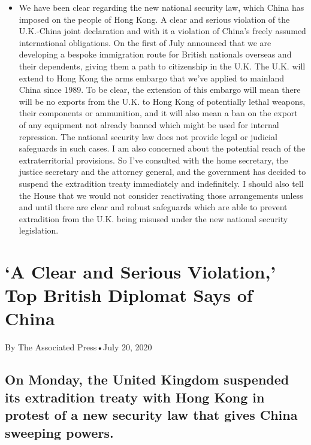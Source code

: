 \begin{itemize}
\tightlist
\item
  We have been clear regarding the new national security law, which
  China has imposed on the people of Hong Kong. A clear and serious
  violation of the U.K.-China joint declaration and with it a violation
  of China's freely assumed international obligations. On the first of
  July announced that we are developing a bespoke immigration route for
  British nationals overseas and their dependents, giving them a path to
  citizenship in the U.K. The U.K. will extend to Hong Kong the arms
  embargo that we've applied to mainland China since 1989. To be clear,
  the extension of this embargo will mean there will be no exports from
  the U.K. to Hong Kong of potentially lethal weapons, their components
  or ammunition, and it will also mean a ban on the export of any
  equipment not already banned which might be used for internal
  repression. The national security law does not provide legal or
  judicial safeguards in such cases. I am also concerned about the
  potential reach of the extraterritorial provisions. So I've consulted
  with the home secretary, the justice secretary and the attorney
  general, and the government has decided to suspend the extradition
  treaty immediately and indefinitely. I should also tell the House that
  we would not consider reactivating those arrangements unless and until
  there are clear and robust safeguards which are able to prevent
  extradition from the U.K. being misused under the new national
  security legislation.
\end{itemize}

\hypertarget{a-clear-and-serious-violation-top-british-diplomat-says-of-china-1}{%
\section{`A Clear and Serious Violation,' Top British Diplomat Says of
China}\label{a-clear-and-serious-violation-top-british-diplomat-says-of-china-1}}

By The Associated Press•July 20, 2020

\hypertarget{on-monday-the-united-kingdom-suspended-its-extradition-treaty-with-hong-kong-in-protest-of-a-new-security-law-that-gives-china-sweeping-powers-1}{%
\subsection{On Monday, the United Kingdom suspended its extradition
treaty with Hong Kong in protest of a new security law that gives China
sweeping
powers.}\label{on-monday-the-united-kingdom-suspended-its-extradition-treaty-with-hong-kong-in-protest-of-a-new-security-law-that-gives-china-sweeping-powers-1}}

